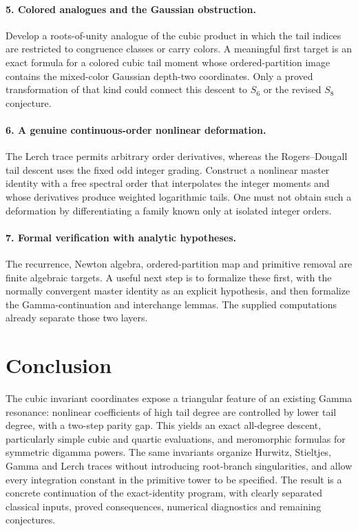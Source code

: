 \documentclass[11pt]{article}
\numberwithin{equation}{section}
\theoremstyle{definition}\newtheorem{definition}[theorem]{Definition}
\theoremstyle{remark}\newtheorem{remark}[theorem]{Remark}
\begin{document}
\paragraph{5. Colored analogues and the Gaussian obstruction.}
Develop a roots-of-unity analogue of the cubic product in which the tail
indices are restricted to congruence classes or carry colors. A meaningful
first target is an exact formula for a colored cubic tail moment whose
ordered-partition image contains the mixed-color Gaussian depth-two
coordinates. Only a proved transformation of that kind could connect
this descent to $S_6$ or the revised $S_8$ conjecture.

\paragraph{6. A genuine continuous-order nonlinear deformation.}
The Lerch trace permits arbitrary order derivatives, whereas the
Rogers--Dougall tail descent uses the fixed odd integer grading. Construct
a nonlinear master identity with a free spectral order that interpolates
the integer moments and whose derivatives produce weighted logarithmic
tails. One must not obtain such a deformation by differentiating a family
known only at isolated integer orders.

\paragraph{7. Formal verification with analytic hypotheses.}
The recurrence, Newton algebra, ordered-partition map and primitive
removal are finite algebraic targets. A useful next step is to formalize
these first, with the normally convergent master identity as an explicit
hypothesis, and then formalize the Gamma-continuation and interchange
lemmas. The supplied computations already separate those two layers.

\section*{Conclusion}
The cubic invariant coordinates expose a triangular feature of an existing
Gamma resonance: nonlinear coefficients of high tail degree are controlled
by lower tail degree, with a two-step parity gap. This yields an exact
all-degree descent, particularly simple cubic and quartic evaluations,
and meromorphic formulas for symmetric digamma powers. The same invariants
organize Hurwitz, Stieltjes, Gamma and Lerch traces without introducing
root-branch singularities, and allow every integration constant in the
primitive tower to be specified. The result is a concrete continuation of
the exact-identity program, with clearly separated classical inputs,
proved consequences, numerical diagnostics and remaining conjectures.
\end{document}
